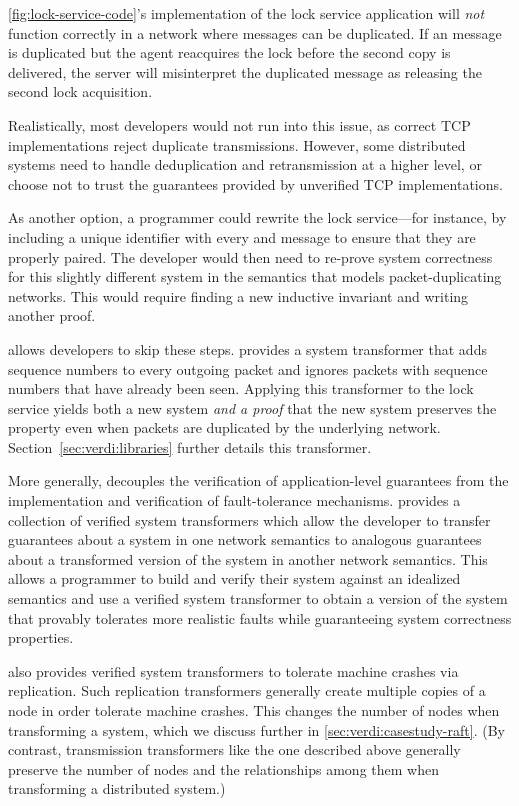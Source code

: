  \cref{fig:lock-service-code}'s
implementation of the lock service application will \emph{not} function
correctly in a network where messages can be duplicated.
%
If an \UnlockMsg message is duplicated but the agent reacquires the lock
before the second copy is delivered, the server will misinterpret the
duplicated \UnlockMsg message as releasing the second lock acquisition.

Realistically, most developers would not run into this issue, as
correct TCP implementations reject duplicate transmissions. However,
some distributed systems need to handle deduplication and
retransmission at a higher level, or choose not to trust the
guarantees provided by unverified TCP implementations.

As another option, a programmer could rewrite the lock service---for
instance, by including a unique identifier with
every \GrantMsg and \UnlockMsg message to ensure that they are
properly paired.
%
The developer would then need to re-prove system correctness for this
slightly different system in the semantics that models packet-duplicating
networks.
%
This would require finding a new inductive invariant and writing another
proof.

%
\Verdi allows developers to skip these steps. \Verdi provides a system
transformer that adds sequence numbers to every outgoing packet and
ignores packets with sequence numbers that have already been seen.
%
Applying this transformer to the lock service yields both a new system
\textit{and a proof} that the new system preserves the 
property even when packets are duplicated by the underlying network.
%
Section~\ref{sec:verdi:libraries} further details this transformer.

More generally, \Verdi decouples the verification of application-level
guarantees from the implementation and verification of fault-tolerance
mechanisms.
%
\Verdi provides a collection of verified system transformers which allow
the developer to transfer guarantees about a system in one network
semantics to analogous guarantees about a transformed version of the
system in another network semantics.
%
This allows a programmer to build and verify their system against an
idealized semantics and use a verified system transformer to obtain a
version of the system that provably tolerates more realistic faults while
guaranteeing system correctness properties.

\Verdi also provides verified system transformers to tolerate
machine crashes via replication.  Such replication transformers generally
create multiple copies of a node in order tolerate machine crashes.
%
This changes the number of nodes when transforming a system, which we
discuss further in \cref{sec:verdi:casestudy-raft}.
%
(By contrast, transmission transformers like the one described above
generally preserve the number of nodes and the relationships among them
when transforming a distributed system.)


